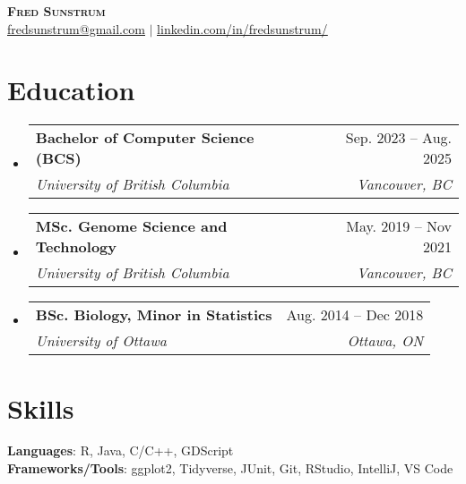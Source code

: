 \documentclass[letterpaper,11pt]{article}
\makeatletter
\newcommand{\resumeSubheading}[4]{
  \vspace{-2pt}\item
    \begin{tabular*}{0.97\textwidth}[t]{l@{\extracolsep{\fill}}r}
      \textbf{#1} & #2 \\
      \textit{\small#3} & \textit{\small #4} \\
    \end{tabular*}\vspace{-7pt}
}
\newcommand{\resumeSubHeadingListStart}{\begin{itemize}[leftmargin=0.15in, label={}]}
\newcommand{\resumeSubHeadingListEnd}{\end{itemize}}
\makeatother
\begin{document}

\begin{center}
    \textbf{\Huge \scshape Fred Sunstrum} \\ \vspace{1pt}\href{mailto:fr.sunstrum@gmail.com}{\underline{fredsunstrum@gmail.com}} $|$ 
    \href{https://linkedin.com/in/fredsunstrum/}{\underline{linkedin.com/in/fredsunstrum/}} %
\end{center}


\section{Education}
  \resumeSubHeadingListStart
    \resumeSubheading
      {Bachelor of Computer Science (BCS)}{Sep. 2023 -- Aug. 2025}
      {University of British Columbia}{Vancouver, BC}
    \resumeSubheading
      {MSc. Genome Science and Technology}{May. 2019 -- Nov 2021}          
      {University of British Columbia}{Vancouver, BC}
    \resumeSubheading
      {BSc. Biology, Minor in Statistics}{Aug. 2014 -- Dec 2018}
      {University of Ottawa}{Ottawa, ON}
      
  \resumeSubHeadingListEnd
%

\section{Skills}
 \begin{itemize}[leftmargin=0.15in, label={}]
    \small{\item{
     \textbf{Languages}{: R, Java, C/C++, GDScript} \\
     \textbf{Frameworks/Tools}{: ggplot2, Tidyverse, JUnit, Git, RStudio, IntelliJ,  VS Code} \\
    }}
 \end{itemize}

\end{document}
